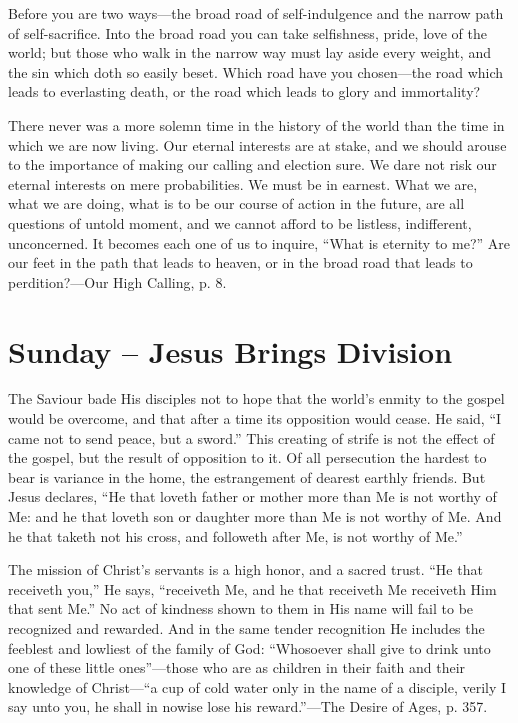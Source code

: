 \documentclass[a4paper, 10pt, twoside, headings=small]{scrartcl}
\begin{document}
\begin{multicols}{2}
Before you are two ways—the broad road of self-indulgence and the narrow path of self-sacrifice. Into the broad road you can take selfishness, pride, love of the world; but those who walk in the narrow way must lay aside every weight, and the sin which doth so easily beset. Which road have you chosen—the road which leads to everlasting death, or the road which leads to glory and immortality?

There never was a more solemn time in the history of the world than the time in which we are now living. Our eternal interests are at stake, and we should arouse to the importance of making our calling and election sure. We dare not risk our eternal interests on mere probabilities. We must be in earnest. What we are, what we are doing, what is to be our course of action in the future, are all questions of untold moment, and we cannot afford to be listless, indifferent, unconcerned. It becomes each one of us to inquire, “What is eternity to me?” Are our feet in the path that leads to heaven, or in the broad road that leads to perdition?—Our High Calling, p. 8.

\section*{Sunday – Jesus Brings Division}

The Saviour bade His disciples not to hope that the world’s enmity to the gospel would be overcome, and that after a time its opposition would cease. He said, “I came not to send peace, but a sword.” This creating of strife is not the effect of the gospel, but the result of opposition to it. Of all persecution the hardest to bear is variance in the home, the estrangement of dearest earthly friends. But Jesus declares, “He that loveth father or mother more than Me is not worthy of Me: and he that loveth son or daughter more than Me is not worthy of Me. And he that taketh not his cross, and followeth after Me, is not worthy of Me.”

The mission of Christ’s servants is a high honor, and a sacred trust. “He that receiveth you,” He says, “receiveth Me, and he that receiveth Me receiveth Him that sent Me.” No act of kindness shown to them in His name will fail to be recognized and rewarded. And in the same tender recognition He includes the feeblest and lowliest of the family of God: “Whosoever shall give to drink unto one of these little ones”—those who are as children in their faith and their knowledge of Christ—“a cup of cold water only in the name of a disciple, verily I say unto you, he shall in nowise lose his reward.”—The Desire of Ages, p. 357.


\end{multicols}
\end{document}
